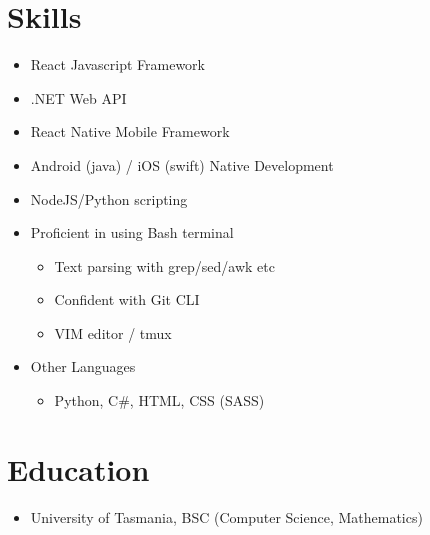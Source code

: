 \documentclass{article}
\begin{document}
\section{Skills}

\begin{itemize}
  \item React Javascript Framework
  \item .NET Web API
  \item React Native Mobile Framework
  \item Android (java) / iOS (swift) Native Development
  \item NodeJS/Python scripting

  \item Proficient in using Bash terminal
  \begin{itemize}
    \item Text parsing with grep/sed/awk etc
    \item Confident with Git CLI
    \item VIM editor / tmux
  \end{itemize}

  \item Other Languages
  \begin{itemize}
    \item Python, C\#, HTML, CSS (SASS)
  \end{itemize}
\end{itemize}

\section{Education}
\begin{itemize}
  \item University of Tasmania, BSC (Computer Science, Mathematics)
\end{itemize}
\end{document}
